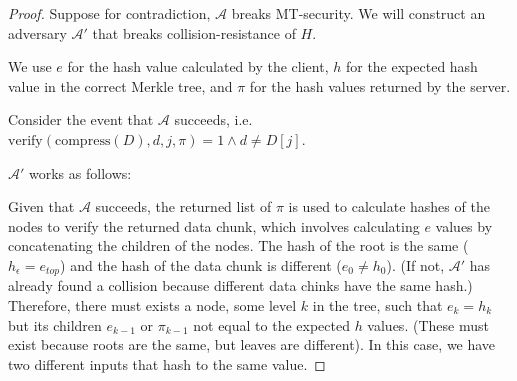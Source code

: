 \begin{proof}
Suppose for contradiction, $\mathcal{A}$ breaks MT-security. We will construct an adversary $\mathcal{A}'$ that breaks collision-resistance of $H$.

\begin{center}
\end{center}

We use $e$ for the hash value calculated by the client, $h$ for the expected hash value in the correct Merkle tree, and $\pi$ for the hash values returned by the server.

Consider the event that $\mathcal{A}$ succeeds, i.e. $\mathrm{verify}(\mathrm{compress}(D), d, j, \pi) = 1 \land d \neq D[j]$.

$\mathcal{A}'$ works as follows:

Given that $\mathcal{A}$ succeeds, the returned list of $\pi$ is used to calculate hashes of the nodes to verify the returned data chunk, which involves calculating $e$ values by concatenating the children of the nodes. The hash of the root is the same ($h_\epsilon = e_{top}$)
and the hash of the data chunk is different ($e_0 \neq h_0$). (If not, $\mathcal{A}'$ has already found a collision because different data chinks have the same hash.)
Therefore, there must exists a node, some level $k$ in the tree, such that $e_k = h_k$ but its children $e_{k-1}$ or $\pi_{k-1}$ not equal to the expected $h$ values. (These must exist because roots are the same, but leaves are different). In this case, we have two different inputs that hash to the same value.


\end{proof}
